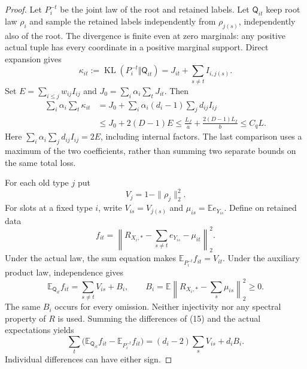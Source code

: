 \documentclass[11pt]{article}
\newcommand{\KL}{\operatorname{KL}}
\newcommand{\E}{\mathbb E}
\begin{document}
\begin{proof}
Let $P_i^{-t}$ be the joint law of the root and retained labels.
Let $\mathsf Q_{it}$ keep root law $\rho_i$ and sample the retained
labels independently from $\rho_{j(s)}$, independently also of the root.
The divergence is finite even at zero marginals: any positive actual
tuple has every coordinate in a positive marginal support. Direct
expansion gives
\[
 \kappa_{it}:=\KL(P_i^{-t}\Vert\mathsf Q_{it})
       =J_{it}+\sum_{s\ne t}I_{i,j(s)}.             \tag{13}
\]
Set $E=\sum_{i\leq j}w_{ij}I_{ij}$ and
$J_0=\sum_i\alpha_i\sum_tJ_{it}$. Then
\begin{align}
 \sum_i\alpha_i\sum_t\kappa_{it}
 &=J_0+\sum_i\alpha_i(d_i-1)\sum_jd_{ij}I_{ij}\nonumber\\
 &\leq J_0+2(D-1)E
 \leq \frac{L_J}{a}+\frac{2(D-1)L_I}{b}
 \leq C_q L.                                    \tag{14}
\end{align}
Here $\sum_i\alpha_i\sum_jd_{ij}I_{ij}=2E$, including internal
factors. The last comparison uses a maximum of the two coefficients,
rather than summing two separate bounds on the same total loss.

For each old type $j$ put
\[
 V_j=1-\|\rho_j\|_2^2.
\]
For slots at a fixed type $i$, write $V_{is}=V_{j(s)}$ and
$\mu_{is}=\E e_{Y_{is}}$. Define on retained data
\[
 f_{it}=\left\|R_{X_i,*}-\sum_{s\ne t}e_{Y_{is}}-\mu_{it}\right\|_2^2.
\]
Under the actual law, the sum equation makes
$\E_{P_i^{-t}}f_{it}=V_{it}$. Under the auxiliary product law,
independence gives
\[
 \E_{\mathsf Q_{it}}f_{it}
       =\sum_{s\ne t}V_{is}+B_i,
 \qquad B_i=\E\left\|R_{X_i,*}-\sum_s\mu_{is}\right\|_2^2\geq0.
                                                               \tag{15}
\]
The same $B_i$ occurs for every omission. Neither injectivity nor any
spectral property of $R$ is used. Summing the differences of (15)
and the actual expectations yields
\[
 \sum_t\bigl(\E_{\mathsf Q_{it}}f_{it}-\E_{P_i^{-t}}f_{it}\bigr)
        =(d_i-2)\sum_sV_{is}+d_iB_i.               \tag{16}
\]
Individual differences can have either sign.


\end{proof}
\end{document}
